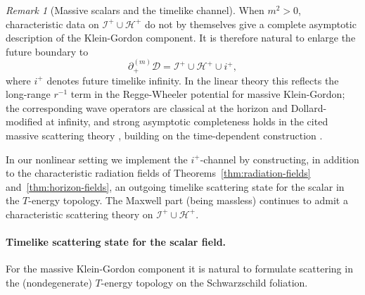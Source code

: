 \documentclass[11pt]{article}
\numberwithin{equation}{section}
\theoremstyle{plain}
\theoremstyle{definition}
\theoremstyle{remark}
\newtheorem{remark}{Remark}[section]
\newcommand{\D}{\mathcal{D}}
\begin{document}
\begin{remark}[Massive scalars and the timelike channel]\label{rem:massive-scalar-scattering}
When $m^{2}>0$, characteristic data on $\mathcal I^{+}\cup\mathcal H^{+}$ do not by themselves give a complete asymptotic description of the Klein-Gordon component.
It is therefore natural to enlarge the future boundary to
\begin{equation}
\partial_{+}^{(m)}\D=\mathcal I^{+}\cup\mathcal H^{+}\cup i^{+},
\end{equation}
where $i^{+}$ denotes future timelike infinity.
In the linear theory this reflects the long-range $r^{-1}$ term in the Regge-Wheeler potential for massive Klein-Gordon; the corresponding wave operators are classical at the horizon and Dollard-modified at infinity, and strong asymptotic completeness holds in the cited massive scattering theory \cite{BachelotKG}, building on the time-dependent construction \cite{Dimock}.

In our nonlinear setting we implement the $i^{+}$-channel by constructing, in addition to the characteristic radiation fields of Theorems~\ref{thm:radiation-fields} and~\ref{thm:horizon-fields}, an outgoing timelike scattering state for the scalar in the $T$-energy topology.
The Maxwell part (being massless) continues to admit a characteristic scattering theory on $\mathcal I^{+}\cup\mathcal H^{+}$.
\end{remark}

\paragraph{Timelike scattering state for the scalar field.}
For the massive Klein-Gordon component it is natural to formulate scattering in the (nondegenerate) $T$-energy topology on the Schwarzschild foliation.
\end{document}
